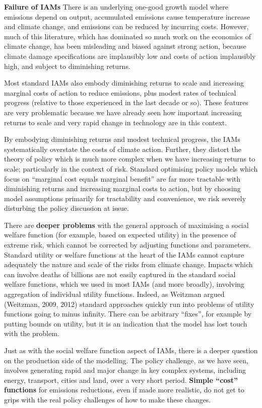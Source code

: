 \documentclass[
]{book}
\begin{document}
\textbf{Failure of IAMs}
There is an underlying
one-good growth model where emissions depend on output, accumulated emissions cause temperature
increase and climate change, and emissions can be reduced by incurring costs. However, much of this
literature, which has dominated so much work on the economics of climate change, has been
misleading and biased against strong action, because climate damage specifications are implausibly
low and costs of action implausibly high, and subject to diminishing returns.

Most standard IAMs also embody diminishing returns to scale and increasing marginal costs of action
to reduce emissions, plus modest rates of technical progress (relative to those experienced in the last
decade or so). These features are very problematic because we have already seen how important
increasing returns to scale and very rapid change in technology are in this context.

By embodying diminishing returns and modest technical progress,
the IAMs systematically overstate the costs of climate action. Further, they distort the theory of policy
which is much more complex when we have increasing returns to scale; particularly in the context of
risk. Standard optimising policy models which focus on ``marginal cost equals marginal benefit'' are far
more tractable with diminishing returns and increasing marginal costs to action, but by choosing model
assumptions primarily for tractability and convenience, we risk severely disturbing the policy discussion
at issue.

There are \textbf{deeper problems} with the general approach of
maximising a social welfare function (for example, based on expected utility) in the presence of extreme
risk, which cannot be corrected by adjusting functions and parameters.
Standard utility or welfare functions at the heart of the IAMs cannot capture
adequately the nature and scale of the risks from climate change.
Impacts which can involve deaths of billions are not easily captured in the standard social welfare
functions, which we used in most IAMs (and more broadly), involving aggregation of individual utility
functions. Indeed, as Weitzman argued (Weitzman, 2009, 2012) standard approaches quickly run into
problems of utility functions going to minus infinity. There can be arbitrary ``fixes'', for example by putting
bounds on utility, but it is an indication that the model has lost touch with the problem.

Just as with the social welfare function aspect of IAMs, there is a deeper question on the production
side of the modelling. The policy challenge, as we have seen, involves generating rapid and major
change in key complex systems, including energy, transport, cities and land, over a very short period.
\textbf{Simple ``cost'' functions} for emissions reductions, even if made more realistic, do not get to grips with the real policy challenges of how to make these changes.
\end{document}
